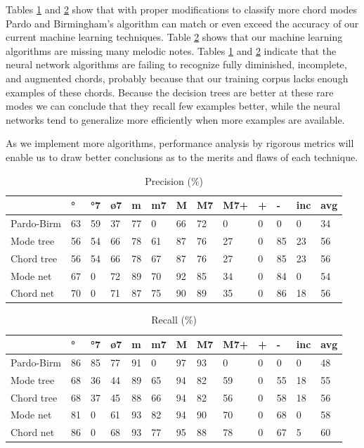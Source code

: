 \documentclass{article}
\begin{document}
Tables \ref{tab:precision} and \ref{tab:recall} show that with proper
modifications to classify more chord modes Pardo and Birmingham's
algorithm can match or even exceed the accuracy of our current machine
learning techniques. Table \ref{tab:recall} shows that our machine
learning algorithms are missing many melodic notes. Tables
\ref{tab:precision} and \ref{tab:recall} indicate that the neural
network algorithms are failing to recognize fully diminished,
incomplete, and augmented chords, probably because that our training
corpus lacks enough examples of these chords. Because the decision
trees are better at these rare modes we can conclude that they recall
few examples better, while the neural networks tend to generalize more
efficiently when more examples are available.

As we implement more algorithms, performance analysis by rigorous
metrics will enable us to draw better conclusions as to the merits and
flaws of each technique.


\begin{table}
  \centering
  \begin{tabular}{l|p{.1cm}p{.1cm}p{.1cm}p{.1cm}p{.1cm}p{.1cm}p{.1cm}p{.1cm}p{.1cm}p{.1cm}p{.1cm}p{.1cm}}
                 &  °& °7& ø7& m&  m7&  M& M7&M7+& + &  -& inc& avg\\
    \hline                                                     
    Pardo-Birm   & 63& 59& 37& 77&  0& 66& 72&  0&  0&  0&   0& 34 \\
    Mode tree    & 56& 54& 66& 78& 61& 87& 76& 27&  0& 85&  23& 56 \\
    Chord tree   & 56& 54& 66& 78& 67& 87& 76& 27&  0& 85&  23& 56 \\
    Mode net     & 67&  0& 72& 89& 70& 92& 85& 34&  0& 84&   0& 54 \\
    Chord net    & 70&  0& 71& 87& 75& 90& 89& 35&  0& 86&  18& 56 \\
  \end{tabular}
  \caption{Precision (\%)}
  \label{tab:precision}
\end{table}

\begin{table}
  \centering
  \begin{tabular}{l|p{.1cm}p{.1cm}p{.1cm}p{.1cm}p{.1cm}p{.1cm}p{.1cm}p{.1cm}p{.1cm}p{.1cm}p{.1cm}p{.1cm}}
                 &  °& °7& ø7& m&  m7&  M& M7&M7+& + &  -& inc& avg\\
    \hline
    Pardo-Birm   & 86& 85& 77& 91&  0& 97& 93&  0&  0&  0&   0& 48 \\
    Mode tree    & 68& 36& 44& 89& 65& 94& 82& 59&  0& 55&  18& 55 \\
    Chord tree   & 68& 37& 45& 88& 66& 94& 82& 56&  0& 58&  18& 56 \\
    Mode net     & 81&  0& 61& 93& 82& 94& 90& 70&  0& 68&   0& 58 \\
    Chord net    & 86&  0& 68& 93& 77& 95& 88& 78&  0& 67&   5& 60 \\
  \end{tabular}
  \caption{Recall (\%)}
  \label{tab:recall}
\end{table}
\end{document}
